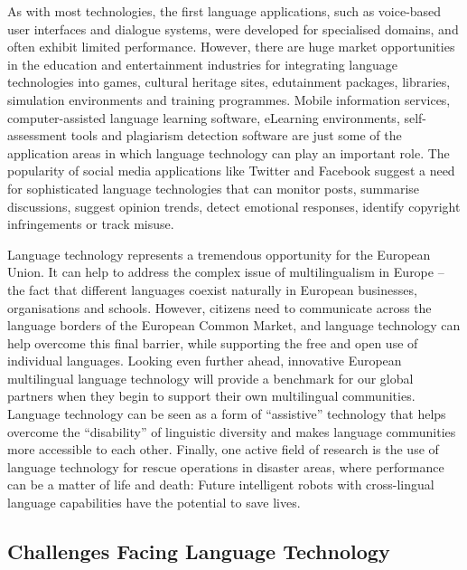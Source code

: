\documentclass[]{../../metanetpaper}
\begin{document}
\begin{multicols}{2}
As with most technologies, the first language applications, such as voice-based user interfaces and dialogue systems, were developed for specialised domains, and often exhibit limited performance. However, there are huge market opportunities in the education and entertainment industries for integrating language technologies into games, cultural heritage sites, edutainment packages, libraries, simulation environments and training programmes. Mobile information services, computer-assisted language learning software, eLearning environments, self-assessment tools and plagiarism detection software are just some of the application areas in which language technology can play an important role. The popularity of social media applications like Twitter and Facebook suggest a need for sophisticated language technologies that can monitor posts, summarise discussions, suggest opinion trends, detect emotional responses, identify copyright infringements or track misuse.


Language technology represents a tremendous opportunity for the European Union. It can help to address the complex issue of multilingualism in Europe -- the fact that different languages coexist naturally in European businesses, organisations and schools. However, citizens need to communicate across the language borders of the European Common Market, and language technology can help overcome this final barrier, while supporting the free and open use of individual languages. Looking even further ahead, innovative European multilingual language technology will provide a benchmark for our global partners when they begin to support their own multilingual communities. Language technology can be seen as a form of “assistive” technology that helps overcome the “disability” of linguistic diversity and makes language communities more accessible to each other. Finally, one active field of research is the use of language technology for rescue operations in disaster areas, where performance can be a matter of life and death: Future intelligent robots with cross-lingual language capabilities have the potential to save lives.

\subsection{Challenges Facing Language Technology}


\end{multicols}
\end{document}
